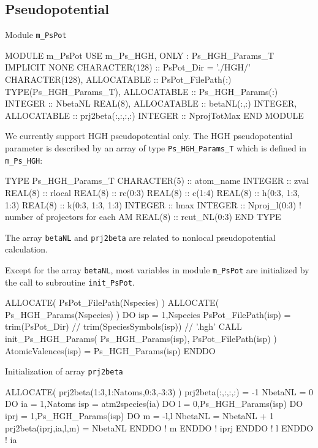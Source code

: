 \subsection{Pseudopotential}

Module {\tt m\_PsPot}

\begin{fortrancode}
MODULE m_PsPot
  USE m_Ps_HGH, ONLY : Ps_HGH_Params_T
  IMPLICIT NONE 
  CHARACTER(128) :: PsPot_Dir = './HGH/'
  CHARACTER(128), ALLOCATABLE :: PsPot_FilePath(:)
  TYPE(Ps_HGH_Params_T), ALLOCATABLE :: Ps_HGH_Params(:)
  INTEGER :: NbetaNL
  REAL(8), ALLOCATABLE :: betaNL(:,:)
  INTEGER, ALLOCATABLE :: prj2beta(:,:,:,:)
  INTEGER :: NprojTotMax
END MODULE 
\end{fortrancode}

We currently support HGH pseudopotential only.
The HGH pseudopotential parameter is described by an array of type {\tt Ps\_HGH\_Params\_T}
which is defined in {\tt m\_Ps\_HGH}:

\begin{fortrancode}
TYPE Ps_HGH_Params_T
  CHARACTER(5) :: atom_name
  INTEGER :: zval
  REAL(8) :: rlocal
  REAL(8) :: rc(0:3)
  REAL(8) :: c(1:4)
  REAL(8) :: h(0:3, 1:3, 1:3)
  REAL(8) :: k(0:3, 1:3, 1:3)
  INTEGER :: lmax
  INTEGER :: Nproj_l(0:3)  ! number of projectors for each AM
  REAL(8) :: rcut_NL(0:3)
END TYPE
\end{fortrancode}

The array {\tt betaNL} and {\tt prj2beta} are related to nonlocal
pseudopotential calculation.

Except for the array {\tt betaNL}, most variables in module {\tt m\_PsPot}
are initialized by the call to
subroutine {\tt init\_PsPot}.

\begin{fortrancode}
ALLOCATE( PsPot_FilePath(Nspecies) )
ALLOCATE( Ps_HGH_Params(Nspecies) )
DO isp = 1,Nspecies
  PsPot_FilePath(isp) = trim(PsPot_Dir) // trim(SpeciesSymbols(isp)) // '.hgh'
  CALL init_Ps_HGH_Params( Ps_HGH_Params(isp), PsPot_FilePath(isp) )
  AtomicValences(isp) = Ps_HGH_Params(isp)%
ENDDO 
\end{fortrancode}

Initialization of array {\tt prj2beta}
\begin{fortrancode}
ALLOCATE( prj2beta(1:3,1:Natoms,0:3,-3:3) )
prj2beta(:,:,:,:) = -1
NbetaNL = 0
DO ia = 1,Natoms
  isp = atm2species(ia)
  DO l = 0,Ps_HGH_Params(isp)%
    DO iprj = 1,Ps_HGH_Params(isp)%
      DO m = -l,l
        NbetaNL = NbetaNL + 1
        prj2beta(iprj,ia,l,m) = NbetaNL
      ENDDO ! m
    ENDDO ! iprj
  ENDDO ! l
ENDDO ! ia
\end{fortrancode}


